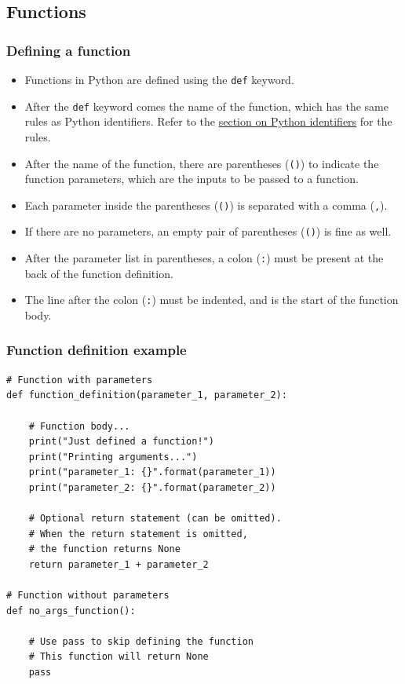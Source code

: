 \documentclass[11pt]{article}
\begin{document}
\subsection{Functions}
\label{sec:orgf0a99e0}

\subsubsection{Defining a function}
\label{sec:org86063f6}
\begin{itemize}
\item Functions in Python are defined using the \texttt{def} keyword.
\item After the \texttt{def} keyword comes the name of the function, which has the same rules as Python identifiers. Refer to the \hyperref[org39026e6]{section on Python identifiers} for the rules.
\item After the name of the function, there are parentheses (\texttt{()}) to indicate the function parameters, which are the inputs to be passed to a function.
\item Each parameter inside the parentheses (\texttt{()}) is separated with a comma (\texttt{,}).
\item If there are no parameters, an empty pair of parentheses (\texttt{()}) is fine as well.
\item After the parameter list in parentheses, a colon (\texttt{:}) must be present at the back of the function definition.
\item The line after the colon (\texttt{:}) must be indented, and is the start of the function body.
\end{itemize}

\subsubsection{Function definition example}
\label{sec:org1977688}
\begin{verbatim}
# Function with parameters
def function_definition(parameter_1, parameter_2):

    # Function body...
    print("Just defined a function!")
    print("Printing arguments...")
    print("parameter_1: {}".format(parameter_1))
    print("parameter_2: {}".format(parameter_2))

    # Optional return statement (can be omitted).
    # When the return statement is omitted,
    # the function returns None
    return parameter_1 + parameter_2

# Function without parameters
def no_args_function():

    # Use pass to skip defining the function
    # This function will return None
    pass
\end{verbatim}
\end{document}
